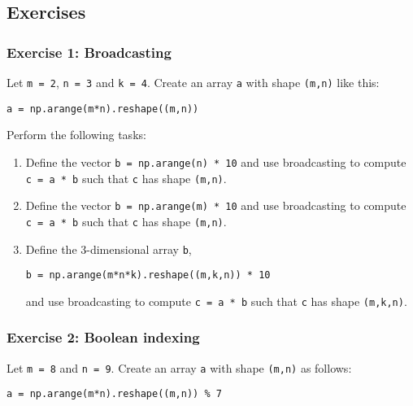 \documentclass[10pt]{scrartcl}
\begin{document}
\hypertarget{exercises}{%
\subsection{Exercises}\label{exercises}}

    \hypertarget{exercise-1-broadcasting}{%
\subsubsection{Exercise 1: Broadcasting}\label{exercise-1-broadcasting}}

Let \texttt{m\ =\ 2}, \texttt{n\ =\ 3} and \texttt{k\ =\ 4}. Create an
array \texttt{a} with shape \texttt{(m,n)} like this:

\begin{verbatim}
a = np.arange(m*n).reshape((m,n))
\end{verbatim}

Perform the following tasks:

\begin{enumerate}
\def\labelenumi{\arabic{enumi}.}
\item
  Define the vector \texttt{b\ =\ np.arange(n)\ *\ 10} and use
  broadcasting to compute \texttt{c\ =\ a\ *\ b} such that \texttt{c}
  has shape \texttt{(m,n)}.
\item
  Define the vector \texttt{b\ =\ np.arange(m)\ *\ 10} and use
  broadcasting to compute \texttt{c\ =\ a\ *\ b} such that \texttt{c}
  has shape \texttt{(m,n)}.
\item
  Define the 3-dimensional array \texttt{b},

\begin{verbatim}
b = np.arange(m*n*k).reshape((m,k,n)) * 10
\end{verbatim}

  and use broadcasting to compute \texttt{c\ =\ a\ *\ b} such that
  \texttt{c} has shape \texttt{(m,k,n)}.
\end{enumerate}

    \hypertarget{exercise-2-boolean-indexing}{%
\subsubsection{Exercise 2: Boolean
indexing}\label{exercise-2-boolean-indexing}}

Let \texttt{m\ =\ 8} and \texttt{n\ =\ 9}. Create an array \texttt{a}
with shape \texttt{(m,n)} as follows:

\begin{verbatim}
a = np.arange(m*n).reshape((m,n)) % 7
\end{verbatim}
\end{document}
